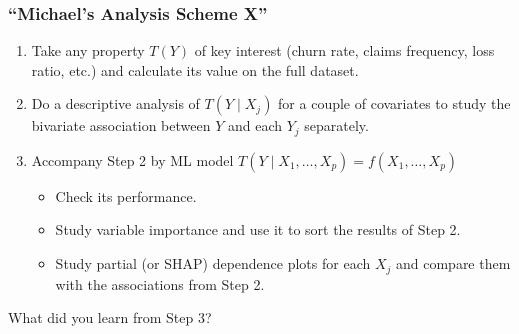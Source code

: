 \documentclass[
    utf8,
    aspectratio=169
]{beamer}  %
\begin{document}
\begin{frame}
	\frametitle{``Michael’s Analysis Scheme X''}
	\begin{enumerate}
		\item Take any property $T(Y)$ of key interest (churn rate, claims frequency, loss ratio, etc.) and calculate its value on the full dataset.
		\item Do a descriptive analysis of $T(Y \mid X_j)$ for a couple of covariates to study the bivariate association between $Y$ and each $Y_j$ separately.
		\item Accompany Step 2 by ML model $T(Y\mid X_1, \dots, X_p)=f(X_1, \dots, X_p)$
			\begin{itemize}
				\item Check its performance.
				\item Study variable importance and use it to sort the results of Step 2.
				\item Study partial (or SHAP) dependence plots for each $X_j$ and compare them with the associations from Step 2.
			\end{itemize}
	\end{enumerate}

	\begin{block}{What did you learn from Step 3?}
	\end{block}
\end{frame}

\end{document}
